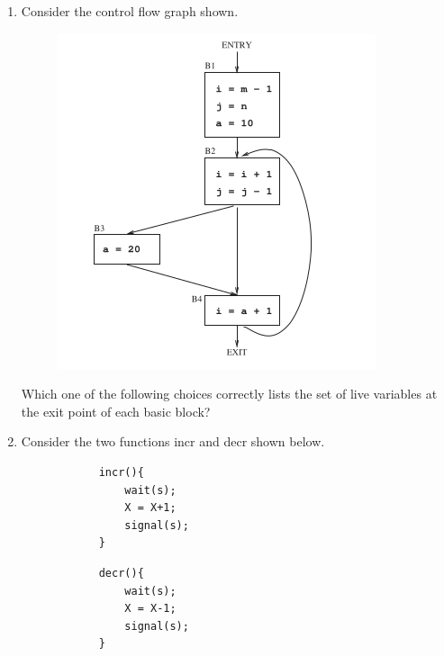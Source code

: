 \documentclass[journal,12pt,onecolumn]{IEEEtran}
\theoremstyle{remark}
\begin{document}
\begin{enumerate}
\begin{enumerate}
\begin{multicols}{2}
			\end{multicols}
		\end{enumerate}
\item Consider the control flow graph shown.
\begin{figure}[H]
	\centering
	\includegraphics[width=0.5\linewidth]{figs/screenshot003}
	\caption{}
	\label{fig:screenshot003}
\end{figure}


		
		Which one of the following choices correctly lists the set of live variables at the exit point of each basic block?
		
		\hfill{}
		
		\begin{enumerate}
		\end{enumerate}
		
	\item Consider the two functions incr and decr shown below.
	
	\begin{minipage}{0.45\textwidth}
		\begin{verbatim}
			incr(){
				wait(s);
				X = X+1;
				signal(s);
			}
		\end{verbatim}
	\end{minipage}
	\hfill
	\vrule
	\hfill
	\begin{minipage}{0.45\textwidth}
		\begin{verbatim}
			decr(){
				wait(s);
				X = X-1;
				signal(s);
			}
		\end{verbatim}
	\end{minipage}
	

\end{enumerate}
\end{document}
